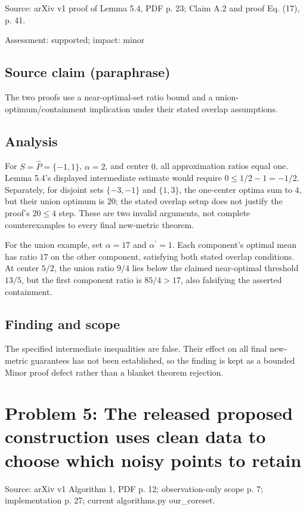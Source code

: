 \documentclass[11pt]{article}
\begin{document}
Source: arXiv v1 proof of Lemma 5.4, PDF p. 23; Claim A.2 and proof Eq. (17), p. 41.

Assessment: supported; impact: minor

\subsection*{Source claim (paraphrase)}

The two proofs use a near-optimal-set ratio bound and a union-optimum/containment implication under their stated overlap assumptions.

\subsection*{Analysis}

For \(S=\widehat P=\{-1,1\}\), \(\alpha=2\), and center \(0\), all approximation ratios equal one. Lemma 5.4's displayed intermediate estimate would require \(0\le1/2-1=-1/2\). Separately, for disjoint sets \(\{-3,-1\}\) and \(\{1,3\}\), the one-center optima sum to \(4\), but their union optimum is \(20\); the stated overlap setup does not justify the proof's \(20\le4\) step. These are two invalid arguments, not complete counterexamples to every final new-metric theorem.

For the union example, set \(\alpha=17\) and \(\alpha^{\prime}=1\). Each component’s optimal mean has ratio \(17\) on the other component, satisfying both stated overlap conditions. At center \(5/2\), the union ratio \(9/4\) lies below the claimed near-optimal threshold \(13/5\), but the first component ratio is \(85/4>17\), also falsifying the asserted containment.

\subsection*{Finding and scope}

The specified intermediate inequalities are false. Their effect on all final new-metric guarantees has not been established, so the finding is kept as a bounded Minor proof defect rather than a blanket theorem rejection.

\section*{Problem 5: The released proposed construction uses clean data to choose which noisy points to retain}

Source: arXiv v1 Algorithm 1, PDF p. 12; observation-only scope p. 7; implementation p. 27; current algorithms.py our\_coreset.
\end{document}
